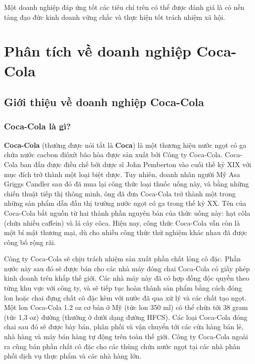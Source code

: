 \documentclass{article}
\begin{document}
    \vspace{0.2cm}
    Một doanh nghiệp đáp ứng tốt các tiêu chí trên có thể được đánh giá là có nền tảng đạo đức kinh doanh vững chắc và thực hiện tốt trách nhiệm xã hội.

\newpage
\section{Phân tích về doanh nghiệp Coca-Cola}
\subsection{Giới thiệu về doanh nghiệp Coca-Cola}
    \subsubsection{Coca-Cola là gì?}
    \vspace{0.2cm}
    \textbf{Coca-Cola} (thường được nói tắt là \textbf{Coca}) là một thương hiệu nước ngọt có ga chứa nước cacbon điôxít bão hòa được sản xuất bởi Công ty Coca-Cola. Coca-Cola ban đầu được điều chế bởi dược sĩ John Pemberton vào cuối thế kỷ XIX với mục đích trở thành một loại biệt dược. Tuy nhiên, doanh nhân người Mỹ Asa Griggs Candler sau đó đã mua lại công thức loại thuốc uống này, và bằng những chiến thuật tiếp thị thông minh, ông đã đưa Coca-Cola trở thành một trong những sản phẩm dẫn đầu thị trường nước ngọt có ga trong thế kỷ XX. Tên của Coca-Cola bắt nguồn từ hai thành phần nguyên bản của thức uống này: hạt côla (chứa nhiều caffein) và lá cây côca. Hiện nay, công thức Coca-Cola vẫn còn là một bí mật thương mại, dù cho nhiều công thức thử nghiệm khác nhau đã được công bố rộng rãi.

    \vspace{0.2cm}
    Công ty Coca-Cola sẽ chịu trách nhiệm sản xuất phần chất lỏng cô đặc. Phần nước này sau đó sẽ được bán cho các nhà máy đóng chai Coca-Cola có giấy phép kinh doanh trên khắp thế giới. Các nhà máy này đã có hợp đồng độc quyền theo từng khu vực với công ty, và sẽ tiếp tục hoàn thành sản phẩm bằng cách đóng lon hoặc chai đựng chất cô đặc kèm với nước đã qua xử lý và các chất tạo ngọt. Một lon Coca-Cola 1.2 oz cơ bản ở Mỹ (tức lon 350 ml) có thể chứa tới 38 gram (tức 1,3 oz) đường (thường ở dưới dạng đường HFCS). Các loại Coca-Cola đóng chai sau đó sẽ được bày bán, phân phối và vận chuyển tới các cửa hàng bán lẻ, nhà hàng và máy bán hàng tự động trên toàn thế giới. Công ty Coca-Cola ngoài ra cũng bán phần chất cô đặc cho các thùng chứa nước ngọt tại các nhà phân phối dịch vụ thực phẩm và các nhà hàng lớn.
\end{document}
